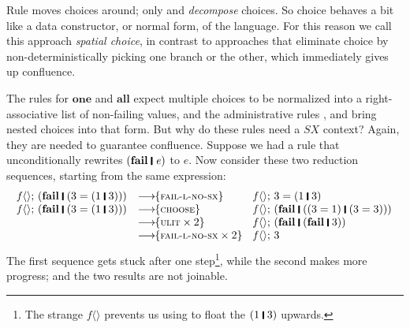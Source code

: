 \documentclass[acmsmall,review,anonymous,dvipsnames]{acmart}
\newcommand{\Conid}[1]{\mathit{#1}}
\newcommand{\Varid}[1]{\mathit{#1}}
\begin{document}
Rule  moves choices around; only  and 
\emph{decompose} choices.
So choice behaves a bit like a data constructor, or normal form, of the language.
For this reason we call
this approach \emph{spatial choice}, in contrast to approaches that eliminate choice by non-deterministically
picking one branch or the other, which immediately gives up confluence.

The rules for \ensuremath{\textbf{one}} and \ensuremath{\textbf{all}} expect multiple choices to be
normalized into a right-associative list of non-failing values, and
the administrative rules , 
and  bring nested choices into that form. But why do these rules
need a \ensuremath{\Conid{SX}} context? Again, they are needed to guarantee confluence. Suppose we had a rule 
that unconditionally rewrites \ensuremath{(\textbf{fail}\;\rule[-0.3mm]{0.5mm}{2.5mm}\;\Varid{e})} to \ensuremath{\Varid{e}}. Now consider these
two reduction sequences, starting from the same expression:
$$
\begin{array}{rll}
\ensuremath{\Varid{f}\langle\rangle;\,(\textbf{fail}\;\rule[-0.3mm]{0.5mm}{2.5mm}\;(\mathrm{3}\mathrel{=}(\mathrm{1}\;\rule[-0.3mm]{0.5mm}{2.5mm}\;\mathrm{3})))} & \movestoR{fail-l-no-sx} & \ensuremath{\Varid{f}\langle\rangle;\,\mathrm{3}\mathrel{=}(\mathrm{1}\;\rule[-0.3mm]{0.5mm}{2.5mm}\;\mathrm{3})} \\
\ensuremath{\Varid{f}\langle\rangle;\,(\textbf{fail}\;\rule[-0.3mm]{0.5mm}{2.5mm}\;(\mathrm{3}\mathrel{=}(\mathrm{1}\;\rule[-0.3mm]{0.5mm}{2.5mm}\;\mathrm{3})))} & \movestoR{choose} & \ensuremath{\Varid{f}\langle\rangle;\,(\textbf{fail}\;\rule[-0.3mm]{0.5mm}{2.5mm}\;((\mathrm{3}\mathrel{=}\mathrm{1})\;\rule[-0.3mm]{0.5mm}{2.5mm}\;(\mathrm{3}\mathrel{=}\mathrm{3})))} \\
 & \movestoRn{ulit}{2}  & \ensuremath{\Varid{f}\langle\rangle;\,(\textbf{fail}\;\rule[-0.3mm]{0.5mm}{2.5mm}\;(\textbf{fail}\;\rule[-0.3mm]{0.5mm}{2.5mm}\;\mathrm{3}))} \\
 & \movestoRn{fail-l-no-sx}{2} & \ensuremath{\Varid{f}\langle\rangle;\,\mathrm{3}}
\end{array}
$$
The first sequence gets stuck after one step\footnote{The strange \ensuremath{\Varid{f}\langle\rangle} prevents
  us using  to float the \ensuremath{(\mathrm{1}\;\rule[-0.3mm]{0.5mm}{2.5mm}\;\mathrm{3})} upwards.}, while the second makes more progress;
and the two results are not joinable.
\end{document}
